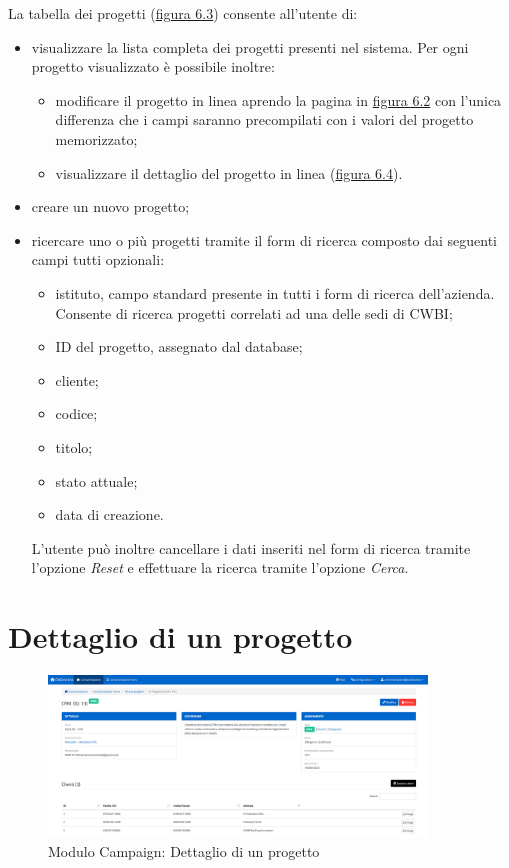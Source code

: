 \noindent La tabella dei progetti ({\hyperref[fig:tabellaProgetti]{figura 6.3}}) consente all'utente di:
\begin{itemize}
\item visualizzare la lista completa dei progetti presenti nel sistema. Per ogni progetto visualizzato è possibile inoltre: 
\begin{itemize}
\item modificare il progetto in linea aprendo la pagina in  {\hyperref[fig:nuovoProgetto]{figura 6.2}} con l'unica differenza che i campi saranno precompilati con i valori del progetto memorizzato;
\item visualizzare il dettaglio del progetto in linea ({\hyperref[fig:dettaglioProgetto]{figura 6.4}}).
\end{itemize}

\item creare un nuovo progetto;
\item ricercare uno o più progetti tramite il form di ricerca composto dai seguenti campi tutti opzionali:
\begin{itemize}
\item istituto, campo standard presente in tutti i form di ricerca dell'azienda. Consente di ricerca progetti correlati ad una delle sedi di CWBI;
\item ID del progetto, assegnato dal database;
\item cliente;
\item codice;
\item titolo;	
\item stato attuale;
\item data di creazione.
\end{itemize}
L'utente può inoltre cancellare i dati inseriti nel form di ricerca tramite l'opzione \textit{Reset} e effettuare la ricerca tramite l'opzione \textit{Cerca}.
\end{itemize}

\pagebreak

\section{Dettaglio di un progetto}
\begin{figure}[!h]
\centering
\includegraphics[width=380px]{../images/UI/04-dettaglioProgetto.png}
\caption{Modulo Campaign: Dettaglio di un progetto}
\label{fig:dettaglioProgetto}
\end{figure}

